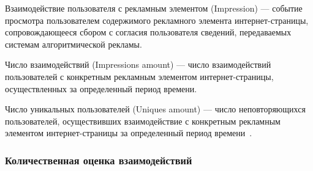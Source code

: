 Взаимодействие пользователя с рекламным элементом (Impression) --- событие просмотра пользователем содержимого
рекламного элемента интернет-страницы, сопровождающееся сбором с согласия пользователя сведений, передаваемых 
системам алгоритмической рекламы.

Число взаимодействий (Impressions amount) --- число взаимодействий пользователей с конкретным рекламным элементом
интернет-страницы, осуществленных за определенный период времени.

Число уникальных пользователей (Uniques amount) --- число неповторяющихся пользователей, осуществивших взаимодействие
с конкретным рекламным элементом интернет-страницы за определенный период времени~\autocite{online:uniquesandimpressions}.

\subsubsection{Количественная оценка взаимодействий}

